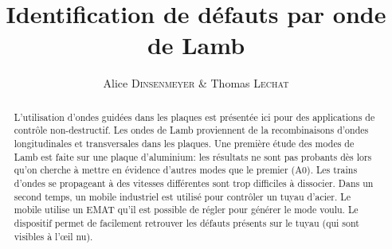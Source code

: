 \documentclass[twoside]{article}
\title{\vspace{-15mm}\fontsize{24pt}{10pt}\selectfont\textbf{Identification de défauts par onde de Lamb}} %
\author{
\large
{Alice \textsc{Dinsenmeyer} \& Thomas \textsc{Lechat}}\\[2mm] %
\vspace{-5mm}
}
\date{}
\begin{document}
\maketitle %

\thispagestyle{fancy} %


\begin{abstract}
L'utilisation d'ondes guidées dans les plaques est présentée ici pour des applications de contrôle non-destructif. Les ondes de Lamb proviennent de la recombinaisons d'ondes longitudinales et transversales dans les plaques. Une première étude des modes de Lamb est faite sur une plaque d'aluminium: les résultats ne sont pas probants dès lors qu'on cherche à mettre en évidence d'autres modes que le premier (A0). Les trains d'ondes se propageant à des vitesses différentes sont trop difficiles à dissocier. Dans un second temps, un mobile industriel est utilisé pour contrôler un tuyau d'acier. Le mobile utilise un EMAT qu'il est possible de régler pour générer le mode voulu. Le dispositif permet de facilement retrouver les défauts présents sur le tuyau (qui sont visibles à l’œil nu).

\end{abstract}

\end{document}
